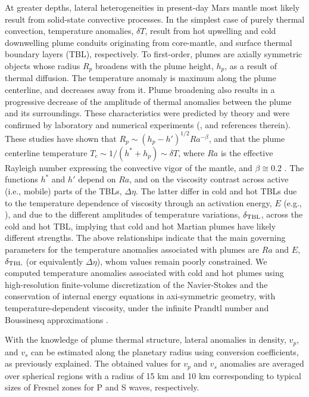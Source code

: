 At greater depths, lateral heterogeneities in present-day Mars mantle most likely result from solid-state convective processes. In the simplest case of purely thermal convection, temperature anomalies, $\delta T$, result from hot upwelling and cold downwelling plume conduits originating from core-mantle, and surface thermal boundary layers (TBL), respectively. To first-order, plumes are axially symmetric objects whose radius $R_p$ broadens with the plume height, $h_p$, as a result of thermal diffusion. The temperature anomaly is maximum along the plume centerline, and decreases away from it. Plume broadening also results in a progressive decrease of the amplitude of thermal anomalies between the plume and its surroundings. These characteristics were predicted by theory \citep{Batchelor1954,Whittaker2006} and were confirmed by laboratory and numerical experiments (\citep{Davaille2011,VanKeken2013}, and references therein). These studies have shown that $R_p \sim (h_p-h')^{1/2} Ra^{-\beta}$, and that the plume centerline temperature $T_c \sim 1/(h^*+h_p) \sim \delta T$, where $Ra$ is the effective Rayleigh number expressing the convective vigor of the mantle, and $\beta \cong $0.2 \citep{Lithgow-Bertelloni2001} . The functions $h^*$ and $h'$ depend on $Ra$, and on the viscosity contrast across active (i.e., mobile) parts of the TBLs, $\Delta \eta$. The latter differ in cold and hot TBLs due to the temperature dependence of viscosity through an activation energy, $E$ (e.g., \citep{Karato1993}), and due to the different amplitudes of temperature variations, $\delta_{\rm TBL}$, across the cold and hot TBL, implying that cold and hot Martian plumes have likely different strengths. The above relationships indicate that the main governing parameters for the temperature anomalies associated with plumes are $Ra$ and $E$, $\delta_{\rm TBL}$ (or equivalently $\Delta \eta$), whom values remain poorly constrained. We computed temperature anomalies associated with cold and hot plumes using high-resolution finite-volume discretization of the Navier-Stokes and the conservation of internal energy equations in axi-symmetric geometry, with temperature-dependent viscosity, under the infinite Prandtl number and Boussinesq approximations \citep{Samuel2012}. 

With the knowledge of plume thermal structure, lateral anomalies in density, $v_p$, and $v_s$ can be estimated along the planetary radius using conversion coefficients, as previously explained. The obtained values for $v_p$ and $v_s$ anomalies are averaged over spherical regions with a radius of 15 km and 10 km corresponding to typical sizes of Fresnel zones for P and S waves, respectively.

